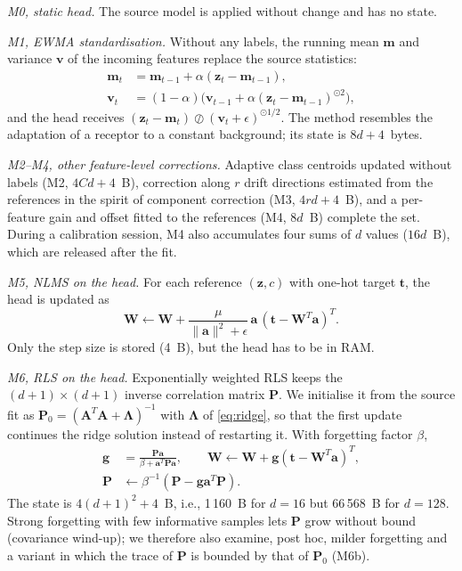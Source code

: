 \documentclass[journal,twoside,web]{ieeecolor}
\begin{document}
\emph{M0, static head.} The source model is applied without change and has no state.

\emph{M1, EWMA standardisation.} Without any labels, the running mean $\boldsymbol m$ and variance $\boldsymbol v$ of the incoming features replace the source statistics:
\begin{align}
\boldsymbol m_t&=\boldsymbol m_{t-1}+\alpha(\boldsymbol z_t-\boldsymbol m_{t-1}),\\
\boldsymbol v_t&=(1-\alpha)\bigl(\boldsymbol v_{t-1}+\alpha(\boldsymbol z_t-\boldsymbol m_{t-1})^{\odot 2}\bigr),
\end{align}
and the head receives $(\boldsymbol z_t-\boldsymbol m_t)\oslash(\boldsymbol v_t+\epsilon)^{\odot 1/2}$. The method resembles the adaptation of a receptor to a constant background; its state is $8d+4$~bytes.

\emph{M2--M4, other feature-level corrections.} Adaptive class centroids updated without labels (M2, $4Cd+4$~B), correction along $r$ drift directions estimated from the references in the spirit of component correction \cite{artursson} (M3, $4rd+4$~B), and a per-feature gain and offset fitted to the references (M4, $8d$~B) complete the set. During a calibration session, M4 also accumulates four sums of $d$ values ($16d$~B), which are released after the fit.

\emph{M5, NLMS on the head.} For each reference $(\boldsymbol z,c)$ with one-hot target $\boldsymbol t$, the head is updated as \cite{haykin}
\begin{equation}
\boldsymbol W\leftarrow\boldsymbol W+\frac{\mu}{\|\boldsymbol a\|^2+\epsilon}\,\boldsymbol a\,(\boldsymbol t-\boldsymbol W^T\boldsymbol a)^T .
\end{equation}
Only the step size is stored (4~B), but the head has to be in RAM.

\emph{M6, RLS on the head.} Exponentially weighted RLS keeps the $(d+1)\times(d+1)$ inverse correlation matrix $\boldsymbol P$. We initialise it from the source fit as $\boldsymbol P_0=(\boldsymbol A^T\boldsymbol A+\boldsymbol\Lambda)^{-1}$ with $\boldsymbol\Lambda$ of \eqref{eq:ridge}, so that the first update continues the ridge solution instead of restarting it. With forgetting factor $\beta$,
\begin{align}
\boldsymbol g&=\frac{\boldsymbol P\boldsymbol a}{\beta+\boldsymbol a^T\boldsymbol P\boldsymbol a},\qquad
\boldsymbol W\leftarrow\boldsymbol W+\boldsymbol g(\boldsymbol t-\boldsymbol W^T\boldsymbol a)^T,\\
\boldsymbol P&\leftarrow\beta^{-1}(\boldsymbol P-\boldsymbol g\boldsymbol a^T\boldsymbol P).
\end{align}
The state is $4(d+1)^2+4$~B, i.e., 1\,160~B for $d=16$ but 66\,568~B for $d=128$. Strong forgetting with few informative samples lets $\boldsymbol P$ grow without bound (covariance wind-up); we therefore also examine, post hoc, milder forgetting and a variant in which the trace of $\boldsymbol P$ is bounded by that of $\boldsymbol P_0$ (M6b).
\end{document}

